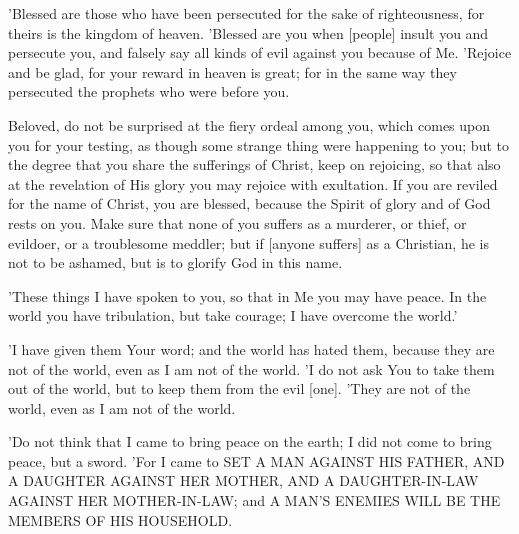 \begin{scripture}[Matthew 5:10-12]
    'Blessed are those who have been persecuted for the sake of righteousness, for theirs is the kingdom of heaven.
    'Blessed are you when [people] insult you and persecute you, and falsely say all kinds of evil against you because of Me.
    'Rejoice and be glad, for your reward in heaven is great; for in the same way they persecuted the prophets who were before you.
\end{scripture}

\begin{scripture}[1 Peter 4:12-16]
    Beloved, do not be surprised at the fiery ordeal among you, which comes upon you for your testing, as though some strange thing were happening to you;
    but to the degree that you share the sufferings of Christ, keep on rejoicing, so that also at the revelation of His glory you may rejoice with exultation.
    If you are reviled for the name of Christ, you are blessed, because the Spirit of glory and of God rests on you.
    Make sure that none of you suffers as a murderer, or thief, or evildoer, or a troublesome meddler;
    but if [anyone suffers] as a Christian, he is not to be ashamed, but is to glorify God in this name.
\end{scripture}

\begin{scripture}[John 16:33]
    'These things I have spoken to you, so that in Me you may have peace. In the world you have tribulation, but take courage; I have overcome the world.'
\end{scripture}

\begin{scripture}[John 17:14-16]
    'I have given them Your word; and the world has hated them, because they are not of the world, even as I am not of the world.
    'I do not ask You to take them out of the world, but to keep them from the evil [one].
    'They are not of the world, even as I am not of the world.
\end{scripture}

\begin{scripture}[Matthew 10:34-36]
    'Do not think that I came to bring peace on the earth; I did not come to bring peace, but a sword.
    'For I came to SET A MAN AGAINST HIS FATHER, AND A DAUGHTER AGAINST HER MOTHER, AND A DAUGHTER-IN-LAW AGAINST HER MOTHER-IN-LAW;
    and A MAN'S ENEMIES WILL BE THE MEMBERS OF HIS HOUSEHOLD.
\end{scripture}

